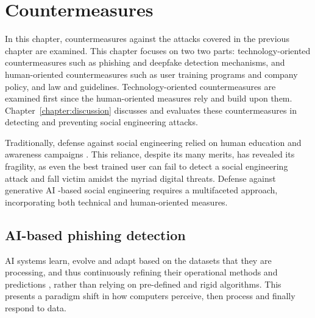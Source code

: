


\chapter{Countermeasures\label{chapter:countermeasures}}

\begin{comment}
    - 
\end{comment}

In this chapter, countermeasures against the attacks covered in the previous chapter are examined. This chapter focuses on two two parts: technology-oriented countermeasures such as phishing and deepfake detection mechanisms, and human-oriented countermeasures such as user training programs and company policy, and law and guidelines. Technology-oriented countermeasures are examined first since the human-oriented measures rely and build upon them. Chapter~\ref{chapter:discussion} discusses and evaluates these countermeasures in detecting and preventing social engineering attacks.

Traditionally, defense against social engineering relied on human education and awareness campaigns \citep{fakhouri_AI_Driven_Solutions_SE_Attacks_2024}. This reliance, despite its many merits, has revealed its fragility, as even the best trained user can fail to detect a social engineering attack and fall victim amidst the myriad digital threats. Defense against generative AI -based social engineering requires a multifaceted approach, incorporating both technical and human-oriented measures.









\section{AI-based phishing detection}
\begin{comment}

AI-generated content detection

What to cover:
    - Deepfake content detection
    - Spear phishing detection

    
\end{comment}



AI systems learn, evolve and adapt based on the datasets that they are processing, and thus continuously refining their operational methods and predictions \citep{fakhouri_AI_Driven_Solutions_SE_Attacks_2024}, rather than relying on pre-defined and rigid algorithms. This presents a paradigm shift in how computers perceive, then process and finally respond to data. 

